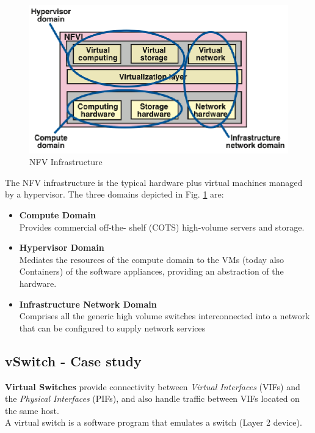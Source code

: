 \begin{paracol}{2}
   \colfill
   \begin{figure}[htbp]
      \centering
      \includegraphics{images/NFV_infr.png}
      \caption{NFV Infrastructure}
      \label{fig:NFV_infr}
   \end{figure}
   \colfill
   \switchcolumn
   \colfill
   The NFV infrastructure is the typical hardware plus virtual machines managed by a hypervisor.
   The three domains depicted in Fig. \ref{fig:NFV_infr} are:
   \begin{itemize}
      \item \textbf{Compute Domain}\\
      Provides commercial off-the- shelf (COTS) high-volume servers and storage.
      \item \textbf{Hypervisor Domain}\\
      Mediates the resources of the compute domain to the VMs (today also Containers) of the software appliances, providing an abstraction of the hardware.
      \item \textbf{Infrastructure Network Domain}\\
      Comprises all the generic high volume switches interconnected into a network that can be configured to supply network services
   \end{itemize}
   \colfill
\end{paracol}

\subsection{vSwitch - Case study}
\textbf{Virtual Switches} provide connectivity between \textit{Virtual Interfaces} (VIFs) and the \textit{Physical Interfaces} (PIFs), and also handle traffic between VIFs located on the same host.\\
A virtual switch is a software program that emulates a switch (Layer 2 device).


